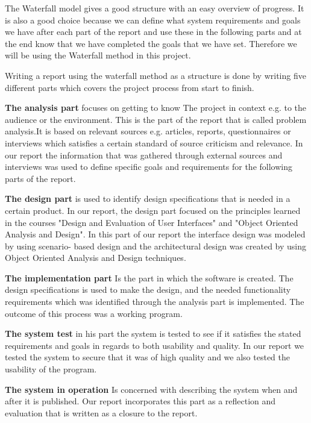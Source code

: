 The Waterfall model gives a good structure with an easy overview of progress. It is also a good choice because we can define what system requirements and goals we have after each part of the report and use these in the following parts and at the end know that we have completed the goals that we have set. Therefore we will be using the Waterfall method in this project.       

Writing a report using the waterfall method as a structure is done by writing five different parts which covers the project process from start to finish.

\textbf{The analysis part} focuses on getting to know The project in context e.g. to the audience or the environment. This is the part of the report that is called problem analysis.It is based on relevant sources e.g. articles, reports, questionnaires or interviews which satisfies a certain standard of source criticism and relevance. In our report the information that was gathered through external sources and interviews was used to define specific goals and requirements for the following parts of the report.

\textbf{The design part} is used to identify design specifications that is needed in a certain product. In our report, the design part focused on the principles learned in the courses "Design and Evaluation of User Interfaces" and "Object Oriented Analysis and Design". In this part of our report the interface design was modeled by using scenario- based design and the architectural design was created by using Object Oriented Analysis and Design techniques. 

\textbf{The implementation part} Is the part in which the software is created. The design specifications is used to make the design, and the needed functionality requirements which was identified through the analysis part is implemented. The outcome of this process was a working program.

\textbf{The system test} in his part the system is tested to see if it satisfies the stated requirements and goals in regards to both usability and quality. In our report we tested the system to secure that it was of high quality and we also tested the usability of the program. 

\textbf{The system in operation} Is concerned with describing the system when and after it is published. Our report incorporates this part as a reflection and evaluation that is written as a closure to the report. 


